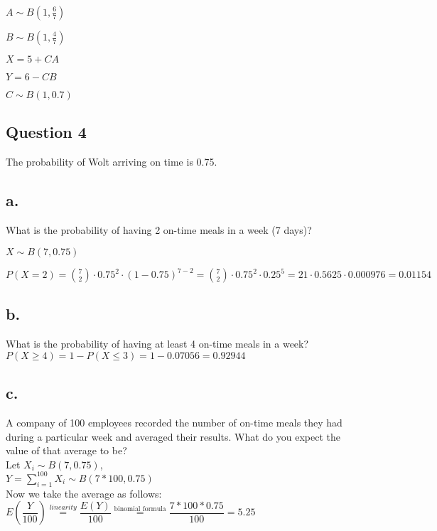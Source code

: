 \documentclass[12pt]{article}
\newcommand\tab[1][1cm]{\hspace*{#1}}
\begin{document}
$ A \sim B(1, \frac{6}{7}) $

$ B \sim B(1, \frac{4}{7}) $

$ X = 5 + CA $

$ Y = 6 - CB $

$ C \sim B(1, 0.7) $
 

\newpage

\begin{center}
\section*{Question 4}
\end{center}

The probability of Wolt arriving on time is 0.75.

\subsection*{a.} 

What is the probability of having 2 on-time meals in a week (7 days)?

$ X \sim B(7, 0.75) $

$ P(X=2) = \binom{7}{2} \cdot 0.75^2 \cdot(1-0.75)^{7-2} = \binom{7}{2} \cdot 0.75^2 \cdot 0.25^5 = 21 \cdot 0.5625 \cdot 0.000976 = 0.01154 $

\subsection*{b.}

What is the probability of having at least 4 on-time meals in a week? \\

$ P(X \geq 4) =  1 - P(X \leq 3) = 1 - 0.07056 = 0.92944$ 

\subsection*{c.}

\tab A company of 100 employees recorded the number of on-time meals they had during a particular week and averaged their results. What do you expect the value of that average to be? \\

Let $X_i \sim B(7, 0.75) $, \\

$Y = \sum_{i=1}^{100} X_i \sim B(7* 100, 0.75) $\\

Now we take the average as follows: \\

$E(\dfrac{Y}{100}) \stackrel{linearity}{=} \dfrac{E(Y)}{100} \stackrel{\text{binomial formula}}{=} \dfrac{7*100*0.75}{100}  = 5.25 $

    
\end{document}
